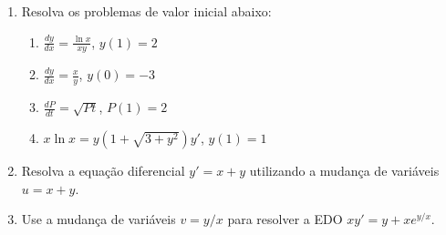 \documentclass[a4paper,5pt]{amsbook}
\newcommand{\ds}{\displaystyle}
\begin{document}
\begin{enumerate}
	\vspace{0.5cm}
    \item Resolva os problemas de valor inicial abaixo:
        \begin{enumerate}
            \vspace{0.3cm}
            \item $\ds\frac{dy}{dx}=\frac{\ln{x}}{xy}$, $y(1)=2$
            \vspace{0.3cm}
            \item $\ds\frac{dy}{dx}=\frac{x}{y}$, $y(0)=-3$
            \vspace{0.3cm}
            \item $\ds\frac{dP}{dt}=\sqrt{Pt}$, $P(1)=2$
            \vspace{0.3cm}
            \item $\ds x\ln{x}=y(1+\sqrt{3+y^2})y'$, $y(1)=1$
        \end{enumerate}

	\vspace{0.5cm}
    \item Resolva a equa\c{c}\~ao diferencial $y'=x+y$ utilizando a mudan\c{c}a de vari\'aveis $u=x+y$.

	\vspace{0.5cm}
    \item Use a mudan\c{c}a de vari\'aveis $v=y/x$ para resolver a EDO $xy'=y+xe^{y/x}$.
\end{enumerate}
\end{document}

